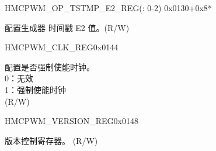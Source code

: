 \begin{register}{H}{MCPWM\_OP\_TSTMP\_E2\_REG(: 0-2)}
{0x0130+0x8*}\label{regdesc:MCPWMOPNTSTMPE2REG}
%
%
\regnewline%
\begin{regdesc}\begin{reglist}
\label{fielddesc:MCPWMOPNTSTMPE2}\item [MCPWM\_OP\regindex{n}\_TSTMP\_E2] 配置生成器 时间戳 E2 值。(R/W)
\end{reglist}\end{regdesc}
\end{register}


\begin{register}{H}{MCPWM\_CLK\_REG}{0x0144}\label{regdesc:MCPWMCLKREG}
%
%
\regnewline%
\begin{regdesc}\begin{reglist}
\label{fielddesc:MCPWMCLKEN}\item [MCPWM\_CLK\_EN] 配置是否强制使能时钟。\\
0：无效 \\
1：强制使能时钟 \\
(R/W)
\end{reglist}\end{regdesc}
\end{register}


\begin{register}{H}{MCPWM\_VERSION\_REG}{0x0148}\label{regdesc:MCPWMVERSIONREG}
%
%
\regnewline%
\begin{regdesc}\begin{reglist}
\label{fielddesc:MCPWMDATE}\item [MCPWM\_DATE] 版本控制寄存器。 (R/W)
\end{reglist}\end{regdesc}
\end{register}


